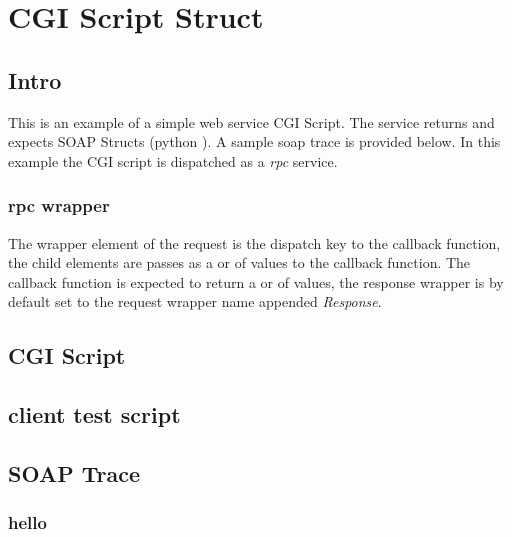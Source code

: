 \chapter{CGI Script Struct}

\section{Intro} This is an example of a simple web service CGI Script.  The service
returns and expects SOAP Structs (python ).  A sample soap trace is
provided below.  In this example the CGI script is dispatched as a \emph{rpc}
service.

\subsection{rpc wrapper} The wrapper element of the request is the dispatch key
to the callback function, the child elements are passes as a  or
 of values to the callback function.  The callback function is
expected to return a  or  of values, the response
wrapper is by default set to the request wrapper name appended \emph{Response}.

\section{CGI Script}


\section{client test script}


\section{SOAP Trace}
\subsection{hello}
\begin{verbatim}
\end{verbatim}
